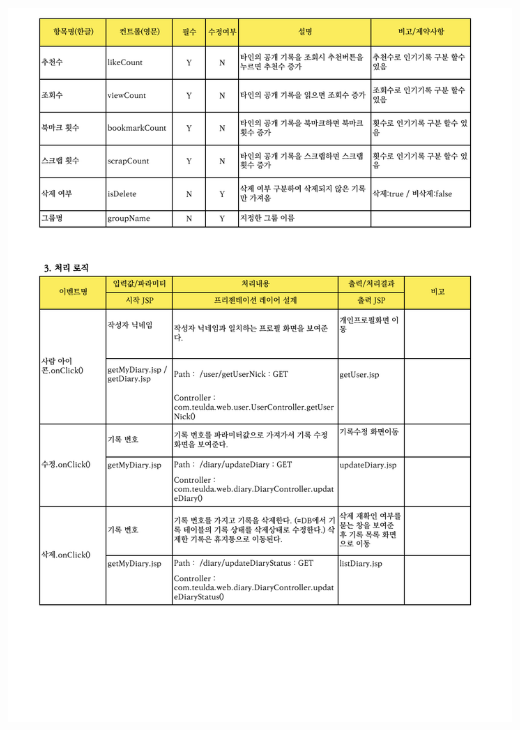 {{{{{{{{{{{{{{{{{{{{{{{{{{\includegraphics[width=20cm]{./Figure/Design/Display/diary/diary_08.pdf} \\
}}}}}}}}}}}}}}}}}}}}}}}}}}

